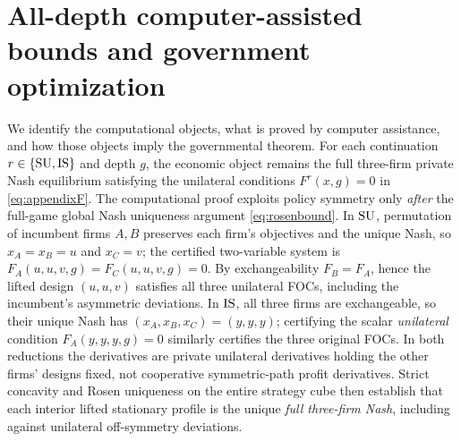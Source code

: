 \section{All-depth computer-assisted bounds and government optimization}\label{app:interval}
We identify the computational objects, what is proved by computer assistance, and how those objects imply the governmental theorem. For each continuation $r\in\{\mathrm{SU},\mathrm{IS}\}$ and depth $g$, the economic object remains the full three-firm private Nash equilibrium satisfying the unilateral conditions $F^r(x,g)=0$ in \eqref{eq:appendixF}. The computational proof exploits policy symmetry only \emph{after} the full-game global Nash uniqueness argument \eqref{eq:rosenbound}. In $\mathrm{SU}$, permutation of incumbent firms $A,B$ preserves each firm's objectives and the unique Nash, so $x_A=x_B=u$ and $x_C=v$; the certified two-variable system is $F_A(u,u,v,g)=F_C(u,u,v,g)=0$. By exchangeability $F_B=F_A$, hence the lifted design $(u,u,v)$ satisfies all three unilateral FOCs, including the incumbent's asymmetric deviations. In $\mathrm{IS}$, all three firms are exchangeable, so their unique Nash has $(x_A,x_B,x_C)=(y,y,y)$; certifying the scalar \emph{unilateral} condition $F_A(y,y,y,g)=0$ similarly certifies the three original FOCs. In both reductions the derivatives are private unilateral derivatives holding the other firms' designs fixed, not cooperative symmetric-path profit derivatives. Strict concavity and Rosen uniqueness on the entire strategy cube then establish that each interior lifted stationary profile is the unique \emph{full three-firm Nash}, including against unilateral off-symmetry deviations.


